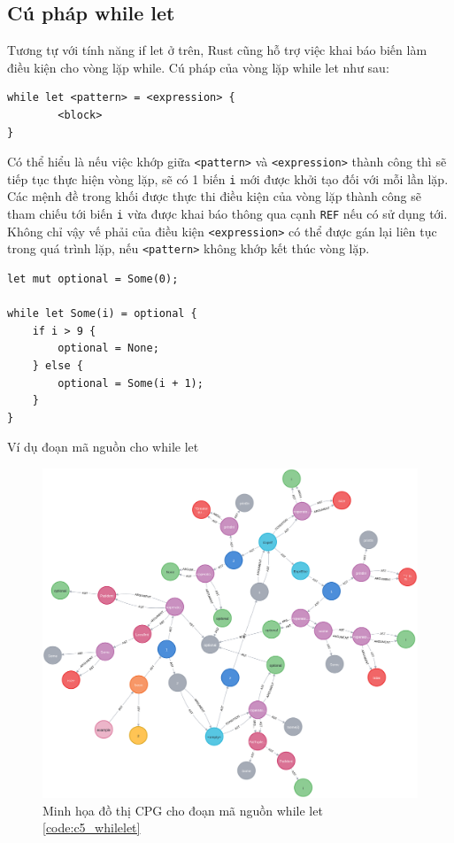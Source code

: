 \subsection{Cú pháp while let}

Tương tự với tính năng if let ở trên, Rust cũng hỗ trợ việc khai báo biến làm điều kiện cho vòng lặp while.
Cú pháp của vòng lặp while let như sau:

\begin{verbatim}
while let <pattern> = <expression> {
        <block>
}
\end{verbatim}

Có thể hiểu là nếu việc khớp giữa \texttt{<pattern>} và \texttt{<expression>} thành công thì sẽ tiếp tục thực hiện vòng lặp, sẽ có 1 biến \texttt{i} mới được khởi tạo đối với mỗi lần lặp.
Các mệnh đề trong khối được thực thi điều kiện của vòng lặp thành công sẽ tham chiếu tới biến \texttt{i} vừa được khai báo thông qua cạnh \texttt{REF} nếu có sử dụng tới.
Không chỉ vậy vế phải của điều kiện \texttt{<expression>} có thể được gán lại liên tục trong quá trình lặp, nếu \texttt{<pattern>} không khớp kết thúc vòng lặp.

\begin{listing}[H]
\begin{verbatim}
let mut optional = Some(0);

while let Some(i) = optional {
    if i > 9 {
        optional = None;
    } else {
        optional = Some(i + 1);
    }
}
\end{verbatim}
\caption{Ví dụ đoạn mã nguồn cho while let}
\label{code:c5_whilelet}
\end{listing}

\begin{figure}[H]
    \includegraphics[width=1\columnwidth]{figures/c5/c5_whilelet.png}
    \centering
    \caption{Minh họa đồ thị CPG cho đoạn mã nguồn while let \ref{code:c5_whilelet}}
    \label{img:c5_cpg_whilelet}
\end{figure}


